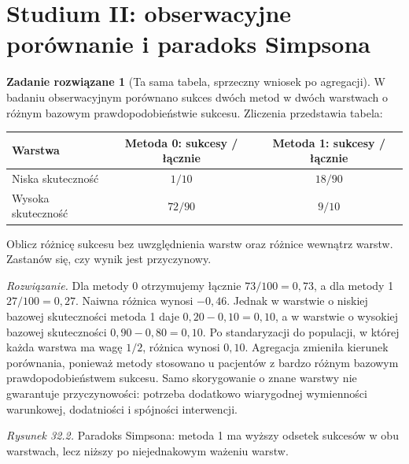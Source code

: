 \documentclass[11pt,a4paper,oneside]{report}
\numberwithin{equation}{chapter}
\theoremstyle{plain}
\theoremstyle{definition}
\newtheorem{zadanie}{Zadanie rozwiązane}[chapter]
\theoremstyle{remark}
\begin{document}
\section{Studium II: obserwacyjne porównanie i paradoks Simpsona}
\begin{zadanie}[Ta sama tabela, sprzeczny wniosek po agregacji]\label{ex:simpson-decision}
W badaniu obserwacyjnym porównano sukces dwóch metod w dwóch warstwach o różnym bazowym prawdopodobieństwie sukcesu. Zliczenia przedstawia tabela:
\begin{center}\small
\begin{tabular}{lcc}
\toprule
\textbf{Warstwa} & \textbf{Metoda 0: sukcesy / łącznie} & \textbf{Metoda 1: sukcesy / łącznie}\\
\midrule
Niska skuteczność & $1/10$ & $18/90$\\
Wysoka skuteczność & $72/90$ & $9/10$\\
\bottomrule
\end{tabular}
\end{center}
Oblicz różnicę sukcesu bez uwzględnienia warstw oraz różnice wewnątrz warstw. Zastanów się, czy wynik jest przyczynowy.\par
\emph{Rozwiązanie.} Dla metody 0 otrzymujemy łącznie $73/100=0{,}73$, a dla metody 1 $27/100=0{,}27$. Naiwna różnica wynosi $-0{,}46$. Jednak w warstwie o niskiej bazowej skuteczności metoda 1 daje $0{,}20-0{,}10=0{,}10$, a w warstwie o wysokiej bazowej skuteczności $0{,}90-0{,}80=0{,}10$. Po standaryzacji do populacji, w której każda warstwa ma wagę $1/2$, różnica wynosi $0{,}10$. Agregacja zmieniła kierunek porównania, ponieważ metody stosowano u pacjentów z bardzo różnym bazowym prawdopodobieństwem sukcesu. Samo skorygowanie o znane warstwy nie gwarantuje przyczynowości: potrzeba dodatkowo wiarygodnej wymienności warunkowej, dodatniości i spójności interwencji.
\end{zadanie}

\begin{center}

{\small\emph{Rysunek 32.2.} Paradoks Simpsona: metoda 1 ma wyższy odsetek sukcesów w obu warstwach, lecz niższy po niejednakowym ważeniu warstw.}
\end{center}
\end{document}
